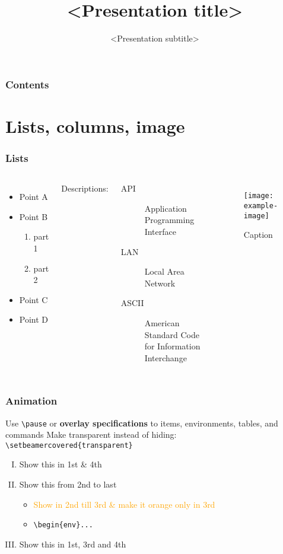 \documentclass[aspectratio=169]{beamer}
\title{<Presentation title>}
\subtitle{<Presentation subtitle>}
\institute{LULEÅ UNIVERSITY OF TECHNOLOGY}
\begin{document}
\frame{\titlepage}

\begin{frame}
  \frametitle{Contents}
  \tableofcontents
\end{frame}

\section{Lists, columns, image}
\begin{frame}[t]

  \frametitle{Lists}
  \begin{columns}
    \begin{itemize}
      \item Point A
      \item Point B
        \begin{enumerate}
          \item part 1
          \item part 2
        \end{enumerate}
      \item Point C
      \item Point D
    \end{itemize}
    Descriptions:
    \begin{description}
      \item[API] Application Programming Interface
      \item[LAN] Local Area Network
      \item[ASCII] American Standard Code for Information Interchange
    \end{description}

    \begin{figure}
      \texttt{[image: example-image]}
      \caption{Caption}
    \end{figure}
  \end{columns}

\end{frame}

\begin{frame}
\frametitle{Animation}
Use \texttt{\textbackslash pause} or \textbf{overlay specifications} to items, environments, tables, and commands
Make transparent instead of hiding: \texttt{\textbackslash setbeamercovered\{transparent\}}
\begin{enumerate}[(I)]
  \item<1,4> Show this in 1st \& 4th
  \item<2-> Show this from 2nd to last
    \begin{itemize}
      \item<2-3> \textcolor<3>{orange}{Show in 2nd till 3rd \& make it orange only in 3rd}
      \item<3-> \texttt{\textbackslash begin\{env\}<n-m>...}
    \end{itemize}
  \item<1,3-4> Show this in 1st, 3rd and 4th
\end{enumerate}
\end{frame}
\end{document}

